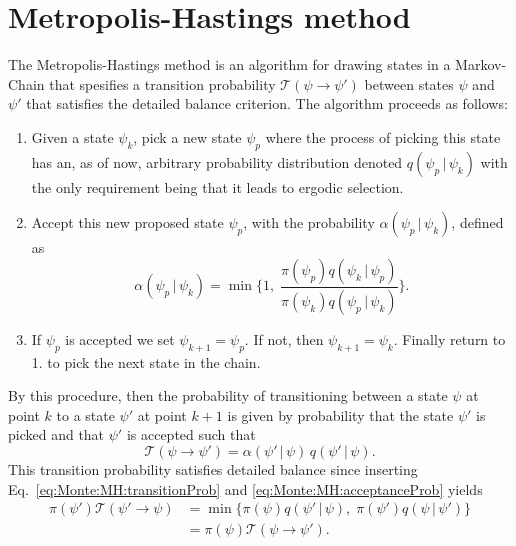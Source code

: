 \section{Metropolis-Hastings method}

The Metropolis-Hastings method is an algorithm for drawing states in a Markov-Chain that spesifies a transition probability
$\mathcal{T}(\psi\to\psi')$ between states $\psi$ and $\psi'$ that satisfies the detailed balance criterion. The algorithm proceeds
as follows:
\begin{enumerate}
    \item Given a state $\psi_k$, pick a new state $\psi_p$ where the process of picking this state has an, as of now, arbitrary
        probability distribution denoted $q(\psi_p\,|\,\psi_k)$ with the only requirement being that it leads to ergodic selection.
    \item Accept this new proposed state $\psi_p$, with the probability $\alpha(\psi_p\,|\,\psi_k)$,
        defined as
        \begin{equation}
            \label{eq:Monte:MH:acceptanceProb}
            \alpha(\psi_p\,|\,\psi_k) = \min\bigg\{1,\;\frac{\pi(\psi_p)q(\psi_k\,|\,\psi_p)}{\pi(\psi_k)q(\psi_p\,|\,\psi_k)}\bigg\}.
        \end{equation}
    \item If $\psi_p$ is accepted we set $\psi_{k+1}=\psi_p$. If not, then $\psi_{k+1}=\psi_k$. Finally return to 1. to pick the next
        state in the chain.
\end{enumerate}
By this procedure, then the probability of transitioning between a state $\psi$ at point $k$ to a state $\psi'$ at point $k+1$ is
given by probability that the state $\psi'$ is picked and that $\psi'$ is accepted such that
\begin{equation}
    \label{eq:Monte:MH:transitionProb}
    \mathcal{T}(\psi\to\psi') = \alpha(\psi'\,|\,\psi)\,q(\psi'\,|\,\psi).
\end{equation}
This transition probability satisfies detailed balance since inserting Eq.~\eqref{eq:Monte:MH:transitionProb} and
\eqref{eq:Monte:MH:acceptanceProb} yields
\begin{equation}
    \label{eq:Monte:MH:detailedBalance}
    \begin{split}
        \pi(\psi')\mathcal{T}(\psi'\to\psi) &= \min\{\pi(\psi)q(\psi'\,|\,\psi),\;\pi(\psi')q(\psi\,|\,\psi')\}\\
        &= \pi(\psi)\mathcal{T}(\psi\to\psi').
    \end{split}
\end{equation}

